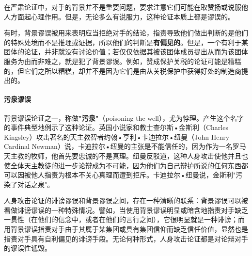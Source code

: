 在严肃论证中，对手的背景并不是重要问题，要求注意它们可能在取赞扬或说服他人方面起心理作用。但是，无论多么有说服力，这种论证本质上都是谬误的。

有时，背景谬误被用来表明应当拒绝对手的结论，指责导致他们做出判断的是他们的特殊处境而不是推理或证据，所以他们的判断是\textbf{有偏见的}。但是，一个有利于某团体的论证，并非就没有讨论价值；若仅仅依据其被该团体成员提出从而为该团体服务为由而非难之，就是犯了背景谬误。例如，赞成保护关税的论证可能是糟糕的，但它们之所以糟糕，却并不是因为它们是由从关税保护中获得好处的制造商提出的。

\paragraph{污泉谬误}
背景谬误论证之一，称做\textbf{"污泉"}（poisoning the well），尤为悖理。产生这个名字的事件典型地例示了这种论证。英国小说家和教士查尔斯•金斯利（Charles Kingsley）攻击著名的天主教智者约翰•亨利•卡迪拉尔•纽曼（John Henry Cardinal Newman）说，卡迪拉尔•纽曼的主张是不能信任的，因为作为一名罗马天主教的牧师，他首先要忠诚的不是真理。纽曼反驳道，这种人身攻击使他并且也使全体天主教徒的进一步论辩成为不可能，因为他们为自己辩护所说的任何东西都可以因被他人指责为根本不关心真理而遭到拒斥。卡迪拉尔•纽曼说，金斯利"污染了对话之泉"。

人身攻击论证的诽谤谬误和背景谬误之间，存在一种清晰的联系：背景谬误可以被看做诽谤谬误的一种特殊情况。譬如，当使用背景谬误明显或暗含地指责对手缺乏一贯性（在他们的信念中，或者在他们的言行之间），它很明显就是一种诽谤；而用背景谬误指责对手由于其属于某集团或具有集团信仰而缺乏信任价值，显然也是指责对手具有自利偏见的诽谤手段。无论何种形式，人身攻击论证都是对论辩对手的谬误性诋毁。 